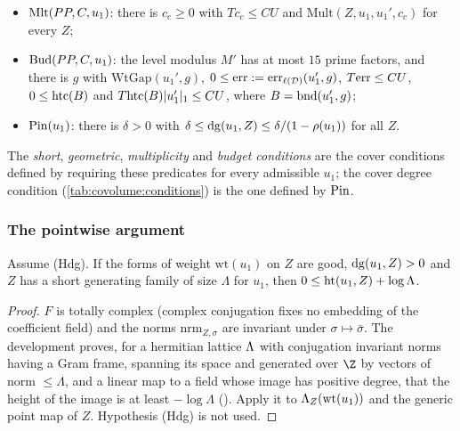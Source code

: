 \begin{definition}
\begin{itemize}
  $(1-\rho(u_1))\liftonedg(u_1,Z)\le\delta'(Z,u_1)$;
\item $\mathrm{Mlt}(PP,C,u_1)$: there is $c_c\ge0$ with $Tc_c\le CU$ and
  $\mathrm{Mult}(Z,u_1,u_1',c_c)$ for every $Z$;
\item $\mathrm{Bud}(PP,C,u_1)$: the level modulus $M'$ has at most $15$ prime factors, and there is
  $g$ with $\mathrm{WtGap}(u_1',g)$, $0\le\mathrm{err}:=\mathrm{err}_{\ell(\mathcal D)}(u_1',g)$,
  $T\mathrm{err}\le CU$, $0\le\mathrm{htc}(B)$ and $T\mathrm{htc}(B)|u_1'|_1\le CU$, where
  $B=\mathrm{bnd}(u_1',g)$;
\item $\mathrm{Pin}(u_1)$: there is $\delta>0$ with
  $\delta\le\mathrm{dg}(u_1,Z)\le\delta/(1-\rho(u_1))$ for all $Z$.
\end{itemize}
The \emph{short}, \emph{geometric}, \emph{multiplicity} and \emph{budget conditions} are the cover
conditions defined by requiring these predicates for every admissible $u_1$;
the cover degree condition (\cref{tab:covolume:conditions}) is the one defined by $\mathrm{Pin}$.
\end{definition}

\subsubsection*{The pointwise argument}

\begin{lemma}\label{pf:lift1:htnonneg}
Assume (Hdg). If the forms of weight $\mathrm{wt}(u_1)$ on $Z$ are good, $\mathrm{dg}(u_1,Z)>0$ and $Z$
has a short generating family of size $\Lambda$ for $u_1$, then $0\le\mathrm{ht}(u_1,Z)+\log\Lambda$.
\end{lemma}

\begin{proof}
$F$ is totally complex (complex conjugation fixes no embedding of the coefficient field) and the norms
$\mathrm{nrm}_{Z,\sigma}$ are invariant under $\sigma\mapsto\bar\sigma$. The development proves, for a
hermitian lattice $\Lambda$ with conjugation invariant norms having a Gram frame, spanning its
space and generated over $\Z$ by vectors of norm $\le\Lambda$, and a linear map to a field whose image
has positive degree, that the height of the image is at least $-\log\Lambda$
(). Apply it to
$\Lambda_Z(\mathrm{wt}(u_1))$ and the generic point map of $Z$. Hypothesis (Hdg) is not used.
\end{proof}

